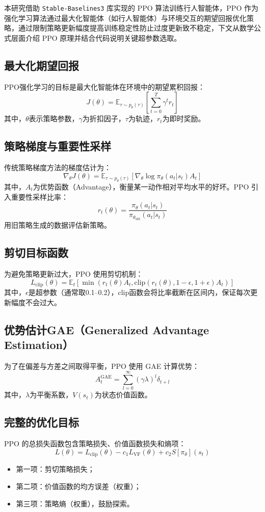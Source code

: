 本研究借助 \texttt{Stable-Baselines3} 库实现的 PPO 算法训练行人智能体，PPO 作为强化学习算法通过最大化智能体（如行人智能体）与环境交互的期望回报优化策略，通过限制策略更新幅度提高训练稳定性防止过度更新致不稳定，下文从数学公式层面介绍 PPO 原理并结合代码说明关键超参数选取。

\subsection{最大化期望回报}
PPO强化学习的目标是最大化智能体在环境中的期望累积回报：
\[
J(\theta) = \mathbb{E}_{\tau \sim p_{\theta}(\tau)} \left[ \sum_{t=0}^{T} \gamma^t r_t \right]
\]
其中，$\theta$表示策略参数，$\gamma$为折扣因子，$\tau$为轨迹，$r_t$为即时奖励。

\subsection{策略梯度与重要性采样}
传统策略梯度方法的梯度估计为：
\[
\nabla_{\theta} J(\theta) = \mathbb{E}_{\tau \sim p_{\theta}(\tau)} \left[ \nabla_{\theta} \log \pi_{\theta}(a_t|s_t) A_t \right]
\]
其中，$A_t$为优势函数（Advantage），衡量某一动作相对平均水平的好坏。PPO 引入重要性采样比率：
\[
r_t(\theta) = \frac{\pi_{\theta}(a_t|s_t)}{\pi_{\theta_{\text{old}}}(a_t|s_t)}
\]
用旧策略生成的数据评估新策略。

\subsection{剪切目标函数}
为避免策略更新过大，PPO 使用剪切机制：
\[
L_{\text{clip}}(\theta) = \mathbb{E}_t \left[ \min \left( r_t(\theta) A_t, \text{clip}(r_t(\theta), 1 - \epsilon, 1 + \epsilon) A_t \right) \right]
\]
其中，$\epsilon$是超参数（通常取0.1–0.2），$\text{clip}$函数会将比率截断在区间内，保证每次更新幅度不会过大。

\subsection{优势估计GAE（Generalized Advantage Estimation）}
为了在偏差与方差之间取得平衡，PPO 使用 GAE 计算优势：
\[
A_t^{\text{GAE}} = \sum_{l=0}^{\infty} (\gamma \lambda)^l \delta_{t+l}
\]
其中，$\lambda$为平衡系数，$V(s_t)$为状态价值函数。

\subsection{完整的优化目标}
PPO 的总损失函数包含策略损失、价值函数损失和熵项：
\[
L(\theta) = L_{\text{clip}}(\theta) - c_1 L_{\text{VF}}(\theta) + c_2 S[\pi_{\theta}](s_t)
\]
\begin{itemize}
    \item 第一项：剪切策略损失；
    \item 第二项：价值函数的均方误差（权重）；
    \item 第三项：策略熵（权重），鼓励探索。
\end{itemize}


